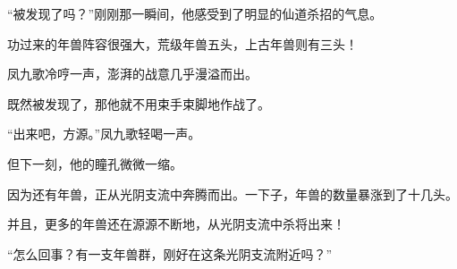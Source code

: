 \begin{this_body}
“被发现了吗？”刚刚那一瞬间，他感受到了明显的仙道杀招的气息。

功过来的年兽阵容很强大，荒级年兽五头，上古年兽则有三头！

凤九歌冷哼一声，澎湃的战意几乎漫溢而出。

既然被发现了，那他就不用束手束脚地作战了。

“出来吧，方源。”凤九歌轻喝一声。

但下一刻，他的瞳孔微微一缩。

因为还有年兽，正从光阴支流中奔腾而出。一下子，年兽的数量暴涨到了十几头。

并且，更多的年兽还在源源不断地，从光阴支流中杀将出来！

“怎么回事？有一支年兽群，刚好在这条光阴支流附近吗？”

\end{this_body}

